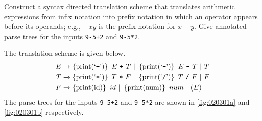 \begin{exercise}\label{ex:020301}
    Construct a syntax directed translation scheme that translates arithmetic 
    expressions from infix notation into prefix notation in which an operator 
    appears before its operands; e.g., $-xy$ is the prefix notation for $x - y$.
    Give annotated parse trees for the inputs \texttt{9-5+2} and \texttt{9-5*2}.
\end{exercise}
\begin{solution}\label{sol:020301}
    The translation scheme is given below.
    \begin{align*}
            E &\yld \cbrak{\text{print(`\texttt{+}')}}\ E\ \texttt{+}\ T\ |\ \cbrak{\text{print(`\texttt{-}')}}\ E\ \texttt{-}\ T\ |\ T \\
            T &\yld \cbrak{\text{print(`\texttt{*}')}}\ T\ \texttt{*}\ F\ |\ \cbrak{\text{print(`\texttt{/}')}}\ T\ \texttt{/}\ F\ |\ F \\
            F &\yld \cbrak{\text{print(id)}}\ id\ |\ \cbrak{\text{print(num)}}\ num\ |\ (E)
    \end{align*}
    The parse trees for the inputs \texttt{9-5+2} and \texttt{9-5*2} are shown 
    in \autoref{fig:020301a} and \autoref{fig:020301b} respectively.
    

    
\end{solution}
